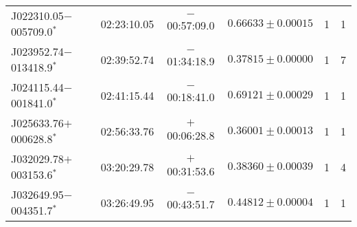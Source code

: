 {\begin{landscape}
\begin{table}
\begin{tabular}{l c c c c c}
J022310.05$-$005709.0$^*$ & 02:23:10.05 & $-$00:57:09.0 & $0.66633\pm0.00015$ & 1 & 1 \\
J023952.74$-$013418.9$^*$ & 02:39:52.74 & $-$01:34:18.9 & $0.37815\pm0.00000$ & 1 & 7 \\
J024115.44$-$001841.0$^*$ & 02:41:15.44 & $-$00:18:41.0 & $0.69121\pm0.00029$ & 1 & 1 \\
J025633.76$+$000628.8$^*$ & 02:56:33.76 & $+$00:06:28.8 & $0.36001\pm0.00013$ & 1 & 1 \\
J032029.78$+$003153.6$^*$ & 03:20:29.78 & $+$00:31:53.6 & $0.38360\pm0.00039$ & 1 & 4 \\
J032649.95$-$004351.7$^*$ & 03:26:49.95 & $-$00:43:51.7 & $0.44812\pm0.00004$ & 1 & 1 \\
\hline
\end{tabular}
\end{table}


\end{landscape}}
